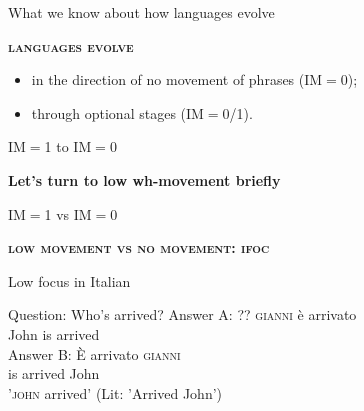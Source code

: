 \documentclass[lesson_slides]{subfiles}
\begin{document}
\begin{frame}[c]{What we know about how languages evolve}

        \noindent \textbf{\textsc{languages evolve}} \pause
        \begin{itemize}
            \item[\ding{227}] in the direction of no movement of phrases (IM$=$0); \pause
            \item[\ding{227}] through optional stages (IM$=$0/1).
        \end{itemize}


\end{frame}
\begin{frame}{IM$=$1 to IM$=$0}

\begin{center}
    \textbf{Let's turn to low wh-movement briefly}
\end{center}
    
\end{frame}
\begin{frame}[c]{IM$=$1 vs IM$=$0}

    \noindent \textbf{\textsc{low movement vs no movement: ifoc}} \pause

    \begin{exe}
    \ex Low focus in Italian \pause
        \begin{xlist}
        \ex Question: Who's arrived? \pause
        \ex \gll Answer A: ?? \textsc{gianni} è arrivato\\
        {} {} {} John is arrived\\ \pause
        \ex \gll Answer B: È arrivato \textsc{gianni}\\
        {} {} is arrived John\\ 
        \glt \hspace{16mm} '\textsc{john} arrived' (Lit: 'Arrived John')
        \end{xlist}
    \end{exe}

\end{frame}
\end{document}
